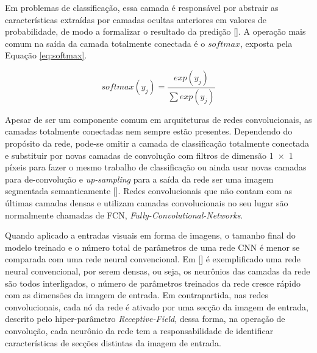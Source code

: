 \begin{enumerate}
            Em problemas de classificação, essa camada é responsável por abstrair as características extraídas por camadas ocultas anteriores em 
            valores de probabilidade, de modo a formalizar o resultado da predição []. A operação mais comum na saída 
            da camada totalmente conectada é o $softmax$, exposta pela Equação \ref{eq:softmax}.
            
            \begin{equation}
                \label{eq:softmax}
                softmax(y_j) = \frac{exp(y_j)}{\sum exp(y_j)}
            \end{equation}
            
            Apesar de ser um componente comum em arquiteturas de redes convolucionais, as camadas totalmente conectadas nem sempre estão 
            presentes. Dependendo do propósito da rede, pode-se omitir a camada de classificação totalmente conectada e substituir por novas camadas 
            de convolução com filtros de dimensão 1 × 1 píxeis para fazer o mesmo trabalho de classificação ou ainda usar novas camadas para 
            de-convolução e \textit{up-sampling} para a saída da rede ser uma imagem segmentada semanticamente []. Redes convolucionais 
            que não contam com as últimas camadas densas e utilizam camadas convolucionais no seu lugar são normalmente chamadas de FCN, \textit{Fully-Convolutional-Networks}.
\end{enumerate}

Quando aplicado a entradas visuais em forma de imagens, o tamanho final do modelo treinado e o número total de parâmetros de uma rede CNN é menor se 
comparada com uma rede neural convencional. Em [] é exemplificado uma rede neural convencional, por serem densas, ou seja, os 
neurônios das camadas da rede são todos interligados, o número de parâmetros treinados da rede cresce rápido com as dimensões da imagem de entrada. 
Em contrapartida, nas redes convolucionais, cada nó da rede é ativado por uma secção da imagem de entrada, descrito pelo hiper-parâmetro \textit{Receptive-Field}, 
dessa forma, na operação de convolução, cada neurônio da rede tem a responsabilidade de identificar características de secções distintas da imagem de entrada.

